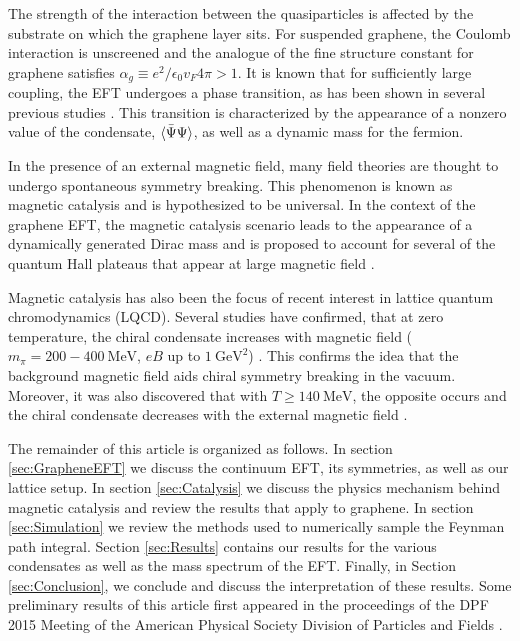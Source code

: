 \documentclass[aps,prd,twocolumn,showpacs,superscriptaddress,groupedaddress]{revtex4}  %
\begin{document}
The strength of the interaction between the quasiparticles is affected by the substrate on which the graphene layer sits. For suspended graphene, the Coulomb interaction is unscreened
and the analogue of the fine structure constant for graphene satisfies $\alpha_g \equiv e^2/\epsilon_0 v_F 4\pi > 1$. It is known that for sufficiently large coupling, the EFT undergoes a phase transition, as has been shown in 
several previous studies \cite{Drut1, Drut2, Hands1, Hands2}. This transition is characterized by the appearance of a nonzero value of the condensate, ${\langle {\bar \Psi} \Psi \rangle}$, as well as a dynamic mass
for the fermion.

In the presence of an external magnetic field, many field theories are thought to undergo spontaneous symmetry breaking. This phenomenon is known as magnetic catalysis and is hypothesized to be universal. In the context of the graphene EFT, the magnetic
catalysis scenario leads to the appearance of a dynamically generated Dirac mass and is proposed to account for several of the quantum Hall plateaus that appear at large magnetic field \cite{ZhangQHE,JiangQHE}.

Magnetic catalysis has also been the focus of recent interest in lattice quantum chromodynamics (LQCD). Several studies have confirmed, that at zero temperature, the chiral condensate
increases with magnetic field ($m_{\pi} = 200-400 ~\text{MeV}$, $eB$ up to $1 ~\text{GeV}^2$) \cite{Buividovich,Braguta}. This confirms the idea that the background magnetic field aids chiral symmetry breaking in the vacuum.
Moreover, it was also discovered that with $T \geq 140 ~\text{MeV}$, the opposite occurs and the chiral condensate decreases with the external magnetic field \cite{Bali1,Bali2}.

The remainder of this article is organized as follows. In section \ref{sec:GrapheneEFT} we discuss the continuum EFT, its symmetries, as well as our lattice setup.
In section \ref{sec:Catalysis} we discuss the physics mechanism behind magnetic catalysis and review the results that apply to graphene. In section \ref{sec:Simulation} we review the methods used to numerically sample the Feynman path integral. Section \ref{sec:Results} contains our results for the various condensates as well as the mass spectrum of the EFT.
Finally, in Section \ref{sec:Conclusion}, we conclude and discuss the interpretation of these results. Some preliminary results of this article first appeared in the proceedings of the DPF 2015 Meeting of the American Physical Society Division of Particles and Fields \cite{DPF2015}.
\end{document}
